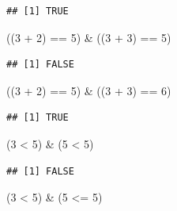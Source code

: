 \documentclass[twoside,symmetric]{book}
\newenvironment{Shaded}{}{}
\newcommand{\DecValTok}[1]{#1}
\newcommand{\NormalTok}[1]{#1}
\newcommand{\OperatorTok}[1]{#1}
\newcommand{\StringTok}[1]{#1}
\begin{document}
\begin{verbatim}
## [1] TRUE
\end{verbatim}

\begin{Shaded}
\begin{Highlighting}[]
\NormalTok{((}\DecValTok{3} \OperatorTok{+}\StringTok{ }\DecValTok{2}\NormalTok{) }\OperatorTok{==}\StringTok{ }\DecValTok{5}\NormalTok{) }\OperatorTok{&}\StringTok{ }\NormalTok{((}\DecValTok{3} \OperatorTok{+}\StringTok{ }\DecValTok{3}\NormalTok{) }\OperatorTok{==}\StringTok{ }\DecValTok{5}\NormalTok{)}
\end{Highlighting}
\end{Shaded}

\begin{verbatim}
## [1] FALSE
\end{verbatim}

\begin{Shaded}
\begin{Highlighting}[]
\NormalTok{((}\DecValTok{3} \OperatorTok{+}\StringTok{ }\DecValTok{2}\NormalTok{) }\OperatorTok{==}\StringTok{ }\DecValTok{5}\NormalTok{) }\OperatorTok{&}\StringTok{ }\NormalTok{((}\DecValTok{3} \OperatorTok{+}\StringTok{ }\DecValTok{3}\NormalTok{) }\OperatorTok{==}\StringTok{ }\DecValTok{6}\NormalTok{)}
\end{Highlighting}
\end{Shaded}

\begin{verbatim}
## [1] TRUE
\end{verbatim}

\begin{Shaded}
\begin{Highlighting}[]
\NormalTok{(}\DecValTok{3} \OperatorTok{<}\StringTok{ }\DecValTok{5}\NormalTok{) }\OperatorTok{&}\StringTok{ }\NormalTok{(}\DecValTok{5} \OperatorTok{<}\StringTok{ }\DecValTok{5}\NormalTok{)}
\end{Highlighting}
\end{Shaded}

\begin{verbatim}
## [1] FALSE
\end{verbatim}

\begin{Shaded}
\begin{Highlighting}[]
\NormalTok{(}\DecValTok{3} \OperatorTok{<}\StringTok{ }\DecValTok{5}\NormalTok{) }\OperatorTok{&}\StringTok{ }\NormalTok{(}\DecValTok{5} \OperatorTok{<=}\StringTok{ }\DecValTok{5}\NormalTok{)}
\end{Highlighting}
\end{Shaded}
\end{document}
